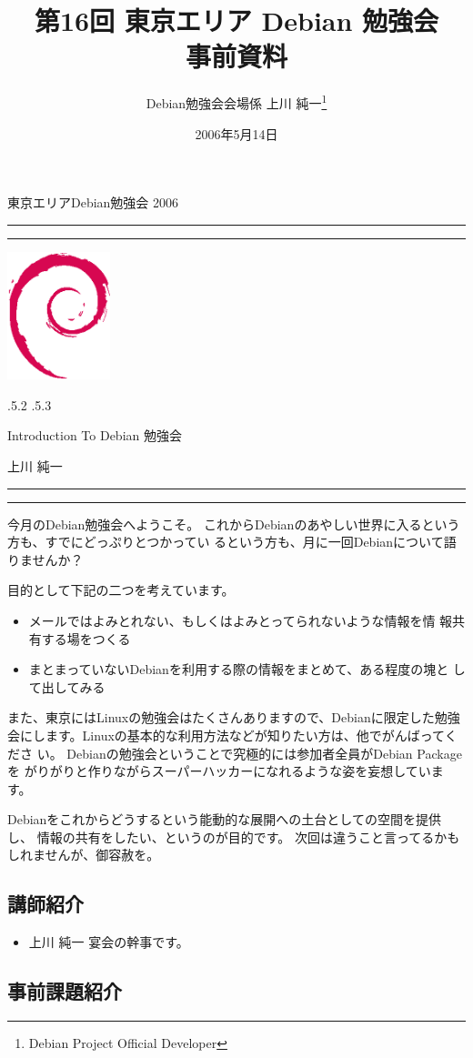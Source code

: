 \documentclass[mingoth,a4paper]{jsarticle}
\makeatletter
\renewcommand{\section}{\@startsection{section}{1}{\z@}%
    {\Cvs \@plus.5\Cdp \@minus.2\Cdp}%
    {.5\Cvs \@plus.3\Cdp}%
    {\normalfont\Large\headfont\raggedright\centering}} %
\newcommand{\dancersection}[2]{%
\newpage
東京エリアDebian勉強会 2006
\hrule
\vspace{0.5mm}
\hrule
\hfill{}\includegraphics[width=3cm]{image200502/openlogo-nd.eps}\\
\vspace{-4cm}
\begin{center}
  \section{#1}
\end{center}
\hfill{}#2\hspace{3cm}\space\\
\hrule
\hrule
\vspace{1cm}
}
\makeatother
\begin{document}
\begin{titlepage}

\title{
 第16回 東京エリア Debian 勉強会\\事前資料}
\date{2006年5月14日}
\author{Debian勉強会会場係 上川 純一\thanks{Debian Project Official Developer}} 
\maketitle
\thispagestyle{empty}
\end{titlepage}

\newpage
\tableofcontents

\dancersection{Introduction To Debian 勉強会}{上川 純一}

今月のDebian勉強会へようこそ。
これからDebianのあやしい世界に入るという方も、すでにどっぷりとつかってい
るという方も、月に一回Debianについて語りませんか？

目的として下記の二つを考えています。

\begin{itemize}
 \item メールではよみとれない、もしくはよみとってられないような情報を情
       報共有する場をつくる
 \item まとまっていないDebianを利用する際の情報をまとめて、ある程度の塊と
       して出してみる
\end{itemize}

また、東京にはLinuxの勉強会はたくさんありますので、Debianに限定した勉強
会にします。Linuxの基本的な利用方法などが知りたい方は、他でがんばってくださ
い。
Debianの勉強会ということで究極的には参加者全員がDebian Packageを
がりがりと作りながらスーパーハッカーになれるような姿を妄想しています。

Debianをこれからどうするという能動的な展開への土台としての空間を提供し、
情報の共有をしたい、というのが目的です。
次回は違うこと言ってるかもしれませんが、御容赦を。

\subsection{講師紹介}

\begin{itemize}
 \item{上川 純一} 宴会の幹事です。
\end{itemize}

\subsection{事前課題紹介}
\end{document}

